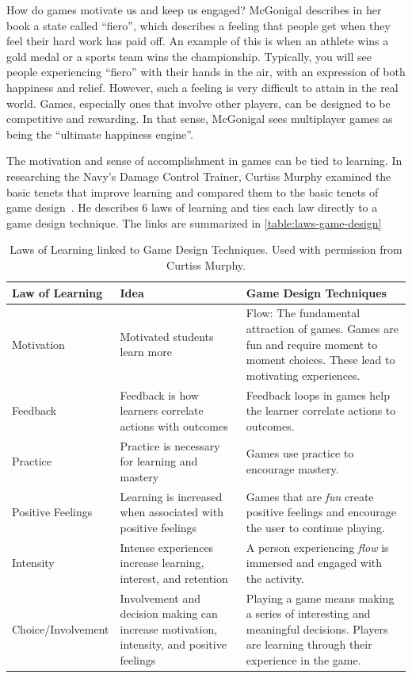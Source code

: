 How do games motivate us and keep us engaged? McGonigal describes in her book a state called ``fiero'', which describes a feeling that people get when they feel their hard work has paid off. An example of this is when an athlete wins a gold medal or a sports team wins the championship. Typically, you will see people experiencing ``fiero'' with their hands in the air, with an expression of both happiness and relief. However, such a feeling is very difficult to attain in the real world. Games, especially ones that involve other players, can be designed to be competitive and rewarding. In that sense, McGonigal sees multiplayer games as being the ``ultimate happiness engine''.

The motivation and sense of accomplishment in games can be tied to learning. In researching the Navy's Damage Control Trainer, Curtiss Murphy examined the basic tenets that improve learning and compared them to the basic tenets of game design~\cite{murphy-science-learning}. He describes 6 laws of learning and ties each law directly to a game design technique. The links are summarized in \autoref{table:laws-game-design}

\begin{table}[t!]
	\begin{tabular}{| l | p{4cm} | p{7cm} |}
		\hline
		Law of Learning & Idea & Game Design Techniques \\
		\hline
		Motivation & Motivated students learn more & Flow: The fundamental attraction of games. Games are fun and require moment to moment choices. These lead to motivating experiences. \\
		Feedback & Feedback is how learners correlate actions with outcomes & Feedback loops in games help the learner correlate actions to outcomes. \\
		Practice & Practice is necessary for learning and mastery & Games use practice to encourage mastery.\\
		Positive Feelings & Learning is increased when associated with positive feelings & Games that are \emph{fun} create positive feelings and encourage the user to continue playing.\\
		Intensity & Intense experiences increase learning, interest, and retention & A person experiencing \emph{flow} is immersed and engaged with the activity.\\
		Choice/Involvement & Involvement and decision making can increase motivation, intensity, and positive feelings & Playing a game means making a series of interesting and meaningful decisions. Players are learning through their experience in the game.\\
	\hline
	\end{tabular}
	\caption{Laws of Learning linked to Game Design Techniques. Used with permission from Curtiss Murphy.}
	\label{table:laws-game-design}
\end{table}

